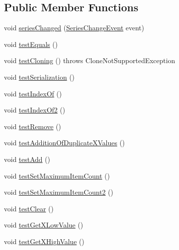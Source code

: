 \subsection*{Public Member Functions}
\begin{DoxyCompactItemize}
\item 
void \mbox{\hyperlink{classorg_1_1jfree_1_1data_1_1xy_1_1_x_interval_series_test_a8c0912dbcbb4b7813965cbd9652d9002}{series\+Changed}} (\mbox{\hyperlink{classorg_1_1jfree_1_1data_1_1general_1_1_series_change_event}{Series\+Change\+Event}} event)
\item 
void \mbox{\hyperlink{classorg_1_1jfree_1_1data_1_1xy_1_1_x_interval_series_test_abf9a3a671e566662dda670cceabed3c8}{test\+Equals}} ()
\item 
void \mbox{\hyperlink{classorg_1_1jfree_1_1data_1_1xy_1_1_x_interval_series_test_a000c4fd9ea42fb96a50d3ced5cdf77f3}{test\+Cloning}} ()  throws Clone\+Not\+Supported\+Exception 
\item 
void \mbox{\hyperlink{classorg_1_1jfree_1_1data_1_1xy_1_1_x_interval_series_test_a6e8b34931e811f664a44556a0a2b6af8}{test\+Serialization}} ()
\item 
void \mbox{\hyperlink{classorg_1_1jfree_1_1data_1_1xy_1_1_x_interval_series_test_a38b23fb1f491a782ed0f184c5fd41d39}{test\+Index\+Of}} ()
\item 
void \mbox{\hyperlink{classorg_1_1jfree_1_1data_1_1xy_1_1_x_interval_series_test_a56731ce2147f2c1b1a6dea2a59aa5610}{test\+Index\+Of2}} ()
\item 
void \mbox{\hyperlink{classorg_1_1jfree_1_1data_1_1xy_1_1_x_interval_series_test_a9b0b7a559eb84b49a6de8d5ff932a7a5}{test\+Remove}} ()
\item 
void \mbox{\hyperlink{classorg_1_1jfree_1_1data_1_1xy_1_1_x_interval_series_test_ad91644677a5baa712c0d3dddc68061d0}{test\+Addition\+Of\+Duplicate\+X\+Values}} ()
\item 
void \mbox{\hyperlink{classorg_1_1jfree_1_1data_1_1xy_1_1_x_interval_series_test_a3ea4a68ec1b209c3347293d98a5de680}{test\+Add}} ()
\item 
void \mbox{\hyperlink{classorg_1_1jfree_1_1data_1_1xy_1_1_x_interval_series_test_aebfe6a5d8fa2b26a0857f865eac230a4}{test\+Set\+Maximum\+Item\+Count}} ()
\item 
void \mbox{\hyperlink{classorg_1_1jfree_1_1data_1_1xy_1_1_x_interval_series_test_a11616be4d91717e59494d8c84cbcdc25}{test\+Set\+Maximum\+Item\+Count2}} ()
\item 
void \mbox{\hyperlink{classorg_1_1jfree_1_1data_1_1xy_1_1_x_interval_series_test_a39f2c910177b5c73a2529ef27c03e0eb}{test\+Clear}} ()
\item 
void \mbox{\hyperlink{classorg_1_1jfree_1_1data_1_1xy_1_1_x_interval_series_test_ad7faa5f32d54275955c59bf7e606757c}{test\+Get\+X\+Low\+Value}} ()
\item 
void \mbox{\hyperlink{classorg_1_1jfree_1_1data_1_1xy_1_1_x_interval_series_test_ae644c2216ba70ea0249f8f76cd09ec53}{test\+Get\+X\+High\+Value}} ()
\end{DoxyCompactItemize}


